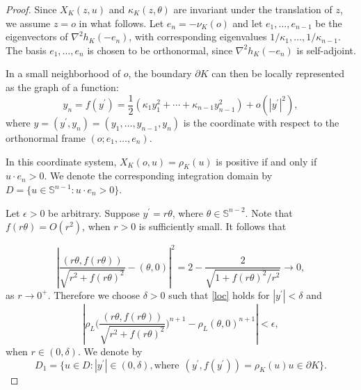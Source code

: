 \documentclass[12pt, oneside,reqno]{amsart}
\numberwithin{equation}{section}
\newtheorem{definition and theorem}[theorem]{Definition and Theorem}
\theoremstyle{plain}
\theoremstyle{remark}
\theoremstyle{definition}
\newcommand{\sn}{{\mathbb S}^{n-1}}
\newcommand{\tH}{\mathcal{H}}
\begin{document}
\begin{proof}
    Since $X_K(z,u)$ and $\kappa_K(z,\theta)$ are invariant under the translation of $z$, we assume $z=o$ in what follows.    
    Let $e_n=-\nu_K(o)$ and let $e_1,\ldots ,e_{n-1}$ be the eigenvectors of $\nabla^2h_K(-e_n)$, with  corresponding eigenvalues $1/\kappa_1,\ldots, 1/\kappa_{n-1}$. The basis $e_1,\ldots, e_n$ is chosen to be orthonormal, since $\nabla^2h_K(-e_n)$ is self-adjoint.
    
    In a small neighborhood of $o$, the boundary $\partial K$ can then be locally represented as the graph of a function:
    \begin{equation}\label{loc}
        y_n=f(y^{\prime})=\frac{1}{2}(\kappa_1y_1^2+\cdots +\kappa_{n-1}y_{n-1}^2)+o(|y^\prime|^2),
    \end{equation}
    where $y=(y^{\prime},y_n)=(y_1,\ldots,y_{n-1},y_n)$ is the coordinate with respect to the orthonormal frame $(o; e_1,\ldots,e_n)$.

    In this coordinate system, $X_K(o,u)=\rho_K(u)$ is positive if and only if $ u\cdot e_n>0$. We denote the corresponding integration domain by $D=\{u\in\sn:  u\cdot e_n>0\}$. 
    
    Let $\epsilon>0$ be arbitrary. Suppose $y^{\prime}=r\theta$, where $\theta\in \mathbb S^{n-2}$. Note that  $f(r\theta)=O(r^2)$, when $r>0$ is sufficiently small. It follows that

    \[
    \left|\frac{(r\theta, f(r\theta))}{\sqrt{r^2+f(r\theta)^2}} - (\theta, 0)\right|^2
    = 2 - \frac{2}{\sqrt{1 + f(r\theta)^2 / r^2}} \to 0,
    \]
     as $r\rightarrow 0^+$. Therefore we choose $\delta>0$ such that \eqref{loc} holds for $|y^{\prime}|<\delta$ and 
    \begin{equation}\label{lem 1 appro 1}
        \left|\rho_L\bigg(\frac{(r\theta, f(r\theta))}{\sqrt{r^2+f(r\theta)^2}}\bigg)^{n+1}-\rho_L(\theta,0)^{n+1}\right|<\epsilon,
    \end{equation}
    when $r\in(0,\delta)$. We denote by
    \[D_1=\{u\in D: |y^{\prime}|\in (0,\delta), \text{where}~~(y^{\prime},f(y^{\prime}))=\rho_K(u)u\in\partial K \}.\]
    


\end{proof}
\end{document}
